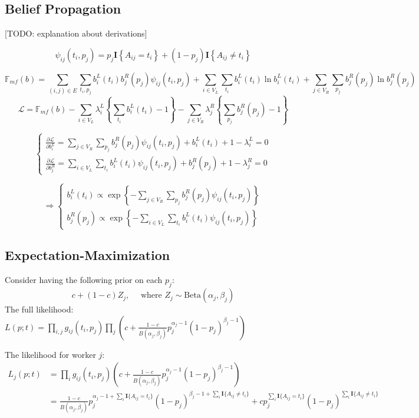 \documentclass[11pt]{article}
\begin{document}
\subsection{Belief Propagation}
[TODO: explanation about derivations]

$$
\psi_{ij}(t_i, p_j) = p_j \mathbf{I} \left\lbrace  A_{ij}=  t_i  \right\rbrace +  (1-p_j ) \mathbf{I} \left\lbrace  A_{ij} \neq  t_i  \right\rbrace
$$

$$
\mathbb{F}_{mf}(b) = \sum_{(i, j) \in E} \sum_{t_i, p_j} b_i^L(t_i) b_j^R(p_j) \psi_{ij}(t_i, p_j) + \sum_{i \in V_L} \sum_{t_i} b_i^L(t_i)  \ln b_i^L(t_i) +  \sum_{j \in V_R} \sum_{p_j} b_j^R(p_j)  \ln b_j^R(p_j)
$$
$$
\mathcal{L} = \mathbb{F}_{mf}(b) - \sum_{i \in V_L} \lambda_i^L \left\lbrace  \sum_{t_i} b_i^L(t_i)  - 1  \right\rbrace - \sum_{j \in V_R} \lambda_j^R \left\lbrace  \sum_{p_j} b_j^R(p_j)  - 1  \right\rbrace
$$

$$
\begin{cases}
\frac{\partial \mathcal{L}}{\partial b_i^L} = \sum_{j \in V_R} \sum_{p_j}  b_j^R(p_j) \psi_{ij}(t_i, p_j) +  b_i^L(t_i) +1 - \lambda_i^L  = 0 \\ 
\frac{\partial \mathcal{L}}{\partial b_j^R} = \sum_{i \in V_L} \sum_{t_i}  b_i^L(t_i) \psi_{ij}(t_i, p_j) +  b_j^R(p_j) +1 - \lambda_j^R  = 0  
\end{cases}
$$

$$
\Rightarrow  
\begin{cases}
b_i^L(t_i) \propto  \exp \left\lbrace  - \sum_{j \in V_R} \sum_{p_j}  b_j^R(p_j) \psi_{ij}(t_i, p_j) \right\rbrace \\ 
b_j^R(p_j) \propto \exp \left\lbrace  - \sum_{i \in V_L} \sum_{t_i}  b_i^L(t_i) \psi_{ij}(t_i, p_j)   \right\rbrace 
\end{cases}
$$

\subsection{Expectation-Maximization}
Consider having the following prior on each $p_j$: 
$$
c + (1-c)Z_j, \quad \text{ where } Z_j \sim \text{Beta}(\alpha_j, \beta_j) 
$$
The full likelihood: 
$L(p; t) = \prod_{i,j} g_{ij}(t_i,p_j) \prod_j \left( c+ \frac{1-c}{B(\alpha_j, \beta_j)} p_j^{\alpha_j-1} (1-p_j)^{\beta_j-1}  \right) $

The likelihood for worker $j$: 
\begin{align*}
L_j(p; t) &= \prod_{i} g_{ij}(t_i,p_j) \left( c+ \frac{1-c}{B(\alpha_j, \beta_j)} p_j^{\alpha_j-1} (1-p_j)^{\beta_j-1}  \right) \\
&= \frac{1-c}{B(\alpha_j, \beta_j)}p_j^{ \alpha_j-1 + \sum_i \mathbf{I} \lbrace A_{ij} = t_i \rbrace }  (1-p_j)^{ \beta_j-1 + \sum_i \mathbf{I} \lbrace A_{ij} \neq t_i \rbrace } + cp_j^{\sum_i \mathbf{I} \lbrace A_{ij} = t_i \rbrace } (1-p_j)^{  \sum_i \mathbf{I} \lbrace A_{ij} \neq t_i \rbrace } 
\end{align*}
\end{document}
